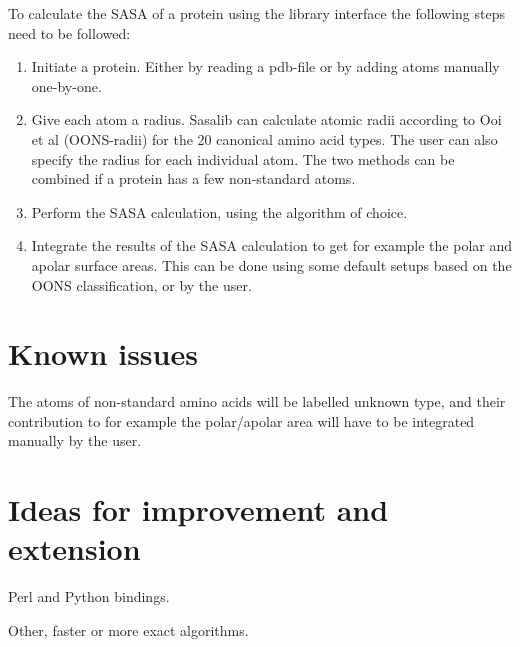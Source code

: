 \documentclass[a4paper,11pt]{article}
\begin{document}
To calculate the SASA of a protein using the library interface the
following steps need to be followed:
\begin{enumerate}
  \item Initiate a protein. Either by reading a pdb-file or by adding
    atoms manually one-by-one.
  \item Give each atom a radius. Sasalib can calculate atomic radii
    according to Ooi et al (OONS-radii) for the 20 canonical amino
    acid types. The user can also specify the radius for each
    individual atom. The two methods can be combined if a protein has
    a few non-standard atoms.
  \item Perform the SASA calculation, using the algorithm of choice.
  \item Integrate the results of the SASA calculation to get for
    example the polar and apolar surface areas. This can be done using
    some default setups based on the OONS classification, or by the
    user.
\end{enumerate}

\section{Known issues}

The atoms of non-standard amino acids will be labelled unknown type,
and their contribution to for example the polar/apolar area will have
to be integrated manually by the user.

\section{Ideas for improvement and extension}

Perl and Python bindings.

Other, faster or more exact algorithms.
\end{document}
